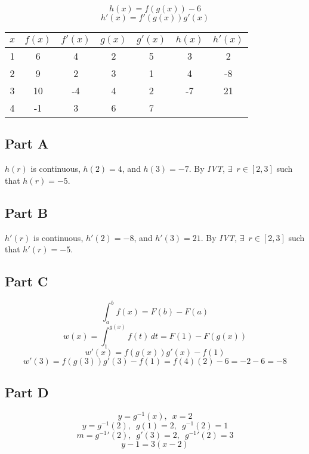 \[ h(x) = f(g(x))-6 \]
\[ h'(x) = f'(g(x))g'(x) \]
\begin{center}
	\begin{tabular}{ | c || c | c | c | c | c | c | }
		\hline
		\rule{0pt}{4ex}
		$x$ & $f(x)$ & $f'(x)$ & $g(x)$ & $g'(x)$ & $h(x)$ & $h'(x)$ \\
		\hline
		\hline
		1 & 6  & 4  & 2 & 5 & 3  & 2 \\
		\hline
		2 & 9  & 2  & 3 & 1 & 4  & -8 \\
		\hline
		3 & 10 & -4 & 4 & 2 & -7 & 21 \\
		\hline
		4 & -1 & 3  & 6 & 7 & & \\
		\hline
	\end{tabular}
\end{center}

\subsection{Part A}
$h(r)$ is continuous, $h(2) = 4$, and $h(3) = -7$. By \textit{IVT}, $\exists \enspace r \in [2, 3]$ such that $h(r) = -5$.

\subsection{Part B}
$h'(r)$ is continuous, $h'(2) = -8$, and $h'(3) = 21$. By \textit{IVT}, $\exists \enspace r \in [2, 3]$ such that $h'(r) = -5$.

\subsection{Part C}
\[ \int_{a}^{b} f(x) = F(b) - F(a) \]
\[ w(x) = \int_{1}^{g(x)} f(t)\,dt = F(1) - F(g(x)) \]
\[ w'(x) = f(g(x))g'(x) - f(1) \]
\[ w'(3) = f(g(3))g'(3) - f(1) = f(4)(2) - 6 = -2 - 6 = -8 \]

\subsection{Part D}
\[ y = g^{-1}(x), \enspace x = 2 \]
\[ y = g^{-1}(2), \enspace g(1) = 2, \enspace g^{-1}(2) = 1 \]
\[ m = g^{-1}'(2), \enspace g'(3) = 2, \enspace g^{-1}'(2) = 3 \]
\[ y - 1 = 3(x - 2) \]
